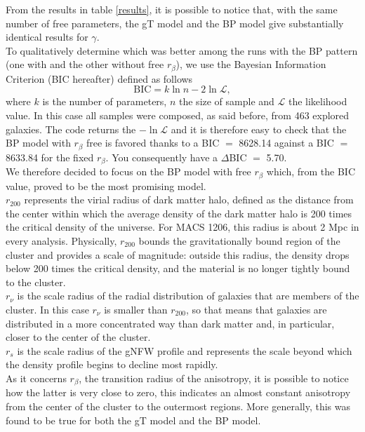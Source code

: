 From the results in table \ref{results}, it is possible to notice that, with the same number of free parameters, the gT model and the BP model give substantially identical results for $\gamma$.\\ To qualitatively determine which was better among the runs with the BP pattern (one with and the other without free $r_\beta$), we use the Bayesian Information Criterion (BIC hereafter) defined as follows
\begin{equation}
    \text{BIC} = k\ln{n} - 2\ln{\mathcal{L}},
\end{equation}
where $k$ is the number of parameters, $n$ the size of sample and $\mathcal{L}$ the likelihood value. In this case all samples were composed, as said before, from 463 explored galaxies. The code returns the $-\ln{\mathcal{L}}$ and it is therefore easy to check that the BP model with $r_\beta$ free is favored thanks to a BIC $=$ 8628.14 against a BIC $=$ 8633.84 for the fixed $r_\beta$. You consequently have a $\Delta$BIC $=$ 5.70.\\
We therefore decided to focus on the BP model with free $r_\beta$ which, from the BIC value, proved to be the most promising model.\\
$r_{200}$ represents the virial radius of dark matter halo, defined as the distance from the center within which the average density of the dark matter halo is 200 times the critical density of the universe. For MACS 1206, this radius is about 2 Mpc in every analysis. Physically, $r_{200}$ bounds the gravitationally bound region of the cluster and provides a scale of magnitude: outside this radius, the density drops below 200 times the critical density, and the material is no longer tightly bound to the cluster.\\
$r_{\nu}$ is the scale radius of the radial distribution of galaxies that are members of the cluster. In this case $r_{\nu}$ is smaller than $r_{200}$, so that means that galaxies are distributed in a more concentrated way than dark matter and, in particular, closer to the center of the cluster.\\
$r_s$ is the scale radius of the gNFW profile and represents the scale beyond which the density profile begins to decline most rapidly.\\
As it concerns $r_\beta$, the transition radius of the anisotropy, it is possible to notice how the latter is very close to zero, this indicates an almost constant anisotropy from the center of the cluster to the outermost regions. More generally, this was found to be true for both the gT model and the BP model.\\
